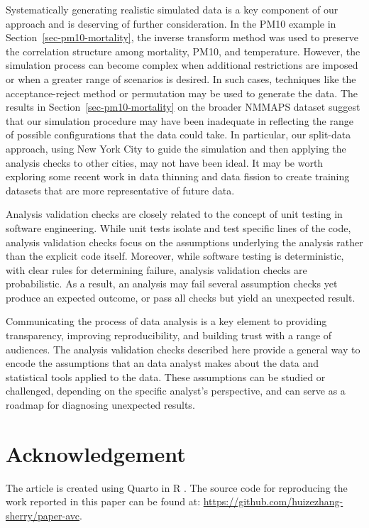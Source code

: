 \documentclass[
  12pt,
]{interact}
\begin{document}
Systematically generating realistic simulated data is a key component of
our approach and is deserving of further consideration. In the PM10
example in Section~\ref{sec-pm10-mortality}, the inverse transform
method was used to preserve the correlation structure among mortality,
PM10, and temperature. However, the simulation process can become
complex when additional restrictions are imposed or when a greater range
of scenarios is desired. In such cases, techniques like the
acceptance-reject method or permutation may be used to generate the
data. The results in Section~\ref{sec-pm10-mortality} on the broader
NMMAPS dataset suggest that our simulation procedure may have been
inadequate in reflecting the range of possible configurations that the
data could take. In particular, our split-data approach, using New York
City to guide the simulation and then applying the analysis checks to
other cities, may not have been ideal. It may be worth exploring some
recent work in data thinning \citep{neufeld2024data} and data fission
\citep{leiner2023data} to create training datasets that are more
representative of future data.

Analysis validation checks are closely related to the concept of unit
testing in software engineering. While unit tests isolate and test
specific lines of the code, analysis validation checks focus on the
assumptions underlying the analysis rather than the explicit code
itself. Moreover, while software testing is deterministic, with clear
rules for determining failure, analysis validation checks are
probabilistic. As a result, an analysis may fail several assumption
checks yet produce an expected outcome, or pass all checks but yield an
unexpected result.

Communicating the process of data analysis is a key element to providing
transparency, improving reproducibility, and building trust with a range
of audiences. The analysis validation checks described here provide a
general way to encode the assumptions that an data analyst makes about
the data and statistical tools applied to the data. These assumptions
can be studied or challenged, depending on the specific analyst's
perspective, and can serve as a roadmap for diagnosing unexpected
results.

\section{Acknowledgement}\label{acknowledgement}

The article is created using Quarto \citep{Allaire_Quarto_2022} in R
\citep{R}. The source code for reproducing the work reported in this
paper can be found at:
\url{https://github.com/huizezhang-sherry/paper-avc}.


\renewcommand\refname{References}
  
\end{document}
